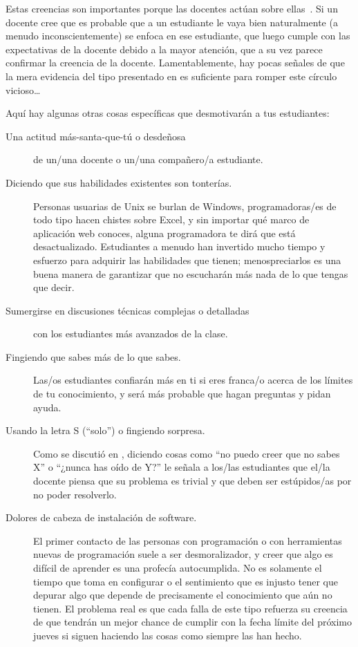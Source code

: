 Estas creencias son importantes porque las docentes actúan sobre ellas~\cite{Brop1983}.
Si un docente cree que es probable que a un estudiante le vaya bien
naturalmente (a menudo inconscientemente) se enfoca en ese estudiante,
que luego cumple con las expectativas de la docente debido a la mayor atención,
que a su vez parece confirmar la creencia de la docente.
Lamentablemente,
hay pocas señales de que la mera evidencia del tipo presentado en \cite{Pati2016}
es suficiente para romper este círculo vicioso{\ldots}

Aquí hay algunas otras cosas específicas que desmotivarán a tus estudiantes:

\begin{description}

\item[Una actitud más-santa-que-tú o desdeñosa]
    de un/una docente o un/una compañero/a estudiante.

\item[Diciendo que sus habilidades existentes son tonterías.]
  Personas usuarias de Unix se burlan de Windows,
  programadoras/es de todo tipo hacen chistes sobre Excel,
  y sin importar qué marco de aplicación web conoces,
  alguna programadora te dirá que está desactualizado.
  Estudiantes a menudo han invertido mucho tiempo y esfuerzo para adquirir las habilidades que tienen;
  menospreciarlos es una buena manera de garantizar que
  no escucharán más nada de lo que tengas que decir.

\item[Sumergirse en discusiones técnicas complejas o detalladas]
   con los estudiantes más avanzados de la clase.

\item[Fingiendo que sabes más de lo que sabes.]
  Las/os estudiantes confiarán más en ti si eres franca/o acerca de los límites de tu conocimiento,
  y será más probable que hagan preguntas y pidan ayuda.

\item[Usando la letra S (``solo'') o fingiendo sorpresa.]
  Como se discutió en ,
  diciendo cosas como ``no puedo creer que no sabes X'' o ``¿nunca has oído de Y?''
  le señala a los/las estudiantes que
  el/la docente piensa que su problema es trivial
  y que deben ser estúpidos/as por no poder resolverlo.

\item[Dolores de cabeza de instalación de software.]
  El primer contacto de las personas con programación o con herramientas nuevas de programación suele a ser desmoralizador,
  y creer que algo es difícil de aprender es una profecía autocumplida.
  No es solamente el tiempo que toma en configurar
  o el sentimiento que es injusto tener que depurar algo que depende de
  precisamente el conocimiento que aún no tienen.
  El problema real es que cada falla de este tipo refuerza su creencia de que
  tendrán un mejor chance de cumplir con la fecha límite del próximo jueves
  si siguen haciendo las cosas como siempre las han hecho.

\end{description}

